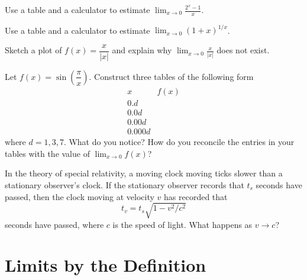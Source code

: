 \begin{exercises}
\begin{exercise} 
Use a table and a calculator to estimate $\lim_{x\to 0}
\frac{2^x-1}{x}$.
\end{exercise}

\begin{exercise} 
Use a table and a calculator to estimate $\lim_{x\to 0} (1+x)^{1/x}$. 
\end{exercise}



\begin{exercise} 
Sketch a plot of $f(x) = \dfrac{x}{|x|}$ and explain why $\lim_{x\to
  0} \frac{x}{|x|}$ does not exist.
\end{exercise}



\begin{exercise} 
Let $f(x) = \sin\left(\dfrac{\pi}{x}\right)$. Construct three tables
of the following form
\[
\begin{array}{c|c}
 x & f(x) \\ \hline
 0.d &   \\
 0.0d &  \\
 0.00d &   \\
 0.000d &  
\end{array}
\]
where $d = 1,3,7$. What do you notice? How do you reconcile the
entries in your tables with the value of $\lim_{x\to 0} f(x)$?
\end{exercise}


\begin{exercise}
In the theory of special relativity, a moving clock moving ticks
slower than a stationary observer's clock. If the stationary observer
records that $t_s$ seconds have passed, then the clock moving at
velocity $v$ has recorded that
\[
t_v = t_s \sqrt{1 - v^2/c^2}
\]
seconds have passed, where $c$ is the speed of light. What happens as $v\to c$?
\end{exercise}


\end{exercises}















\section{Limits by the Definition}



